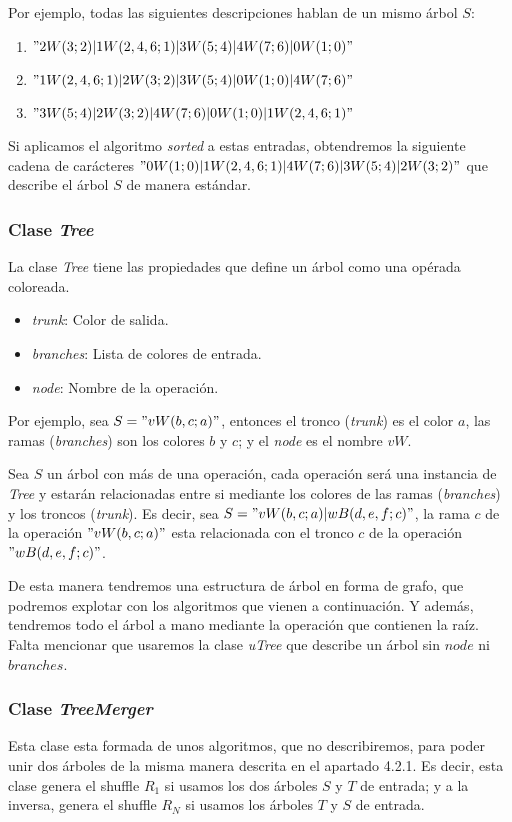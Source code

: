 \documentclass[../main.tex]{subfiles}
\begin{document}
Por ejemplo, todas las siguientes descripciones hablan de un mismo \'arbol $S$:
\begin{enumerate}
    \item $"2W(3;2)|1W(2,4,6;1)|3W(5;4)|4W(7;6)|0W(1;0)"$
    \item $"1W(2,4,6;1)|2W(3;2)|3W(5;4)|0W(1;0)|4W(7;6)"$
    \item $"3W(5;4)|2W(3;2)|4W(7;6)|0W(1;0)|1W(2,4,6;1)"$
\end{enumerate}
Si aplicamos el algoritmo \emph{sorted} a estas entradas, obtendremos la siguiente cadena de car\'acteres $"0W(1;0)|1W(2,4,6;1)|4W(7;6)|3W(5;4)|2W(3;2)"$ que describe el \'arbol $S$ de manera est\'andar.




\subsubsection*{Clase \emph{Tree}}
La clase \emph{Tree} tiene las propiedades que define un \'arbol como una op\'erada coloreada.
\begin{itemize}
    \item \emph{trunk}: Color de salida.
    \item \emph{branches}: Lista de colores de entrada.
    \item \emph{node}: Nombre de la operaci\'on.
\end{itemize}

Por ejemplo, sea $S="vW(b,c;a)"$, entonces el tronco (\emph{trunk}) es el color $a$, las ramas (\emph{branches}) son los colores $b$ y $c$; y el \emph{node} es el nombre $vW$.

Sea $S$ un \'arbol con m\'as de una operaci\'on, cada operaci\'on ser\'a una instancia de \emph{Tree} y estar\'an relacionadas entre si mediante los colores de las ramas (\emph{branches}) y los troncos (\emph{trunk}).
Es decir, sea $S="vW(b,c;a)|wB(d,e,f;c)"$, la rama $c$ de la operaci\'on $"vW(b,c;a)"$ esta relacionada con el tronco $c$ de la operaci\'on $"wB(d,e,f;c)"$.

De esta manera tendremos una estructura de \'arbol en forma de grafo, que podremos explotar con los algoritmos que vienen a continuaci\'on. Y adem\'as, tendremos todo el \'arbol a mano mediante la operaci\'on que contienen la ra\'iz.
Falta mencionar que usaremos la clase \emph{uTree} que describe un \'arbol sin $node$ ni $branches$.

\subsubsection*{Clase \emph{TreeMerger}}
Esta clase esta formada de unos algoritmos, que no describiremos, para poder unir dos \'arboles de la misma manera descrita en el apartado 4.2.1. Es decir, esta clase genera el shuffle $R_1$ si usamos los dos \'arboles $S$ y $T$ de entrada; y a la inversa, genera el shuffle $R_N$ si usamos los \'arboles $T$ y $S$ de entrada.
\end{document}
